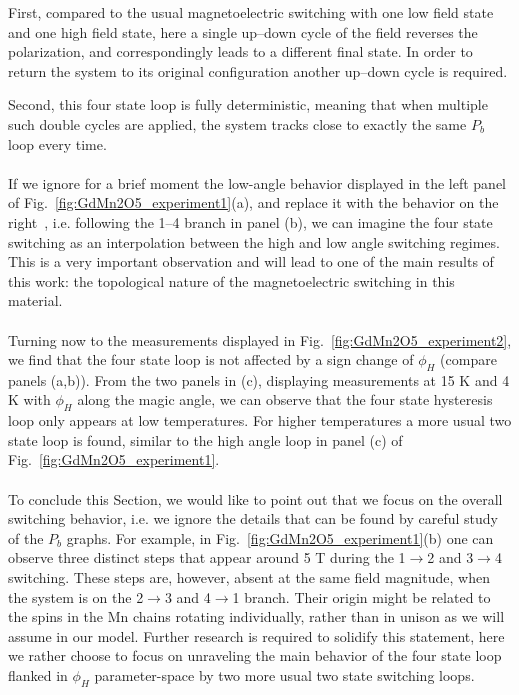 First, compared to the usual magnetoelectric switching with one low field state and one high field state, here a single up--down cycle of the field reverses the polarization, and correspondingly leads to a different final state.
In order to return the system to its original configuration another up--down cycle is required.

Second, this four state loop is fully deterministic, meaning that when multiple such double cycles are applied, the system tracks close to exactly the same $P_b$ loop every time.
\\\\
If we ignore for a brief moment the low-angle behavior displayed in the left panel of Fig.~\ref{fig:GdMn2O5_experiment1}(a), and replace it with the behavior on the right~\cite{Lee13}, i.e. following the 1--4 branch in panel (b), we can imagine the four state switching as an interpolation between the high and low angle switching regimes.
This is a very important observation and will lead to one of the main results of this work: the topological nature of the magnetoelectric switching in this material.
\\\\
Turning now to the measurements displayed in Fig.~\ref{fig:GdMn2O5_experiment2}, we find that the four state loop is not affected by a sign change of $\phi_H$ (compare panels (a,b)).
From the two panels in (c), displaying measurements at 15 K and 4 K with $\phi_H$ along the magic angle, we can observe that the four state hysteresis loop only appears at low temperatures.
For higher temperatures a more usual two state loop is found, similar to the high angle loop in panel (c) of Fig.~\ref{fig:GdMn2O5_experiment1}.
\\\\
To conclude this Section, we would like to point out that we focus on the overall switching behavior, i.e. we ignore the details that can be found by careful study of the $P_b$ graphs.
For example, in Fig.~\ref{fig:GdMn2O5_experiment1}(b) one can observe three distinct steps that appear around 5 T during the 1$\rightarrow$2 and 3$\rightarrow$4 switching.
These steps are, however, absent at the same field magnitude, when the system is on the 2$\rightarrow$3 and 4$\rightarrow$1 branch.
Their origin might be related to the spins in the Mn chains rotating individually, rather than in unison as we will assume in our model.
Further research is required to solidify this statement, here we rather choose to focus on unraveling the main behavior of the four state loop flanked in $\phi_H$ parameter-space by two more usual two state switching loops.

